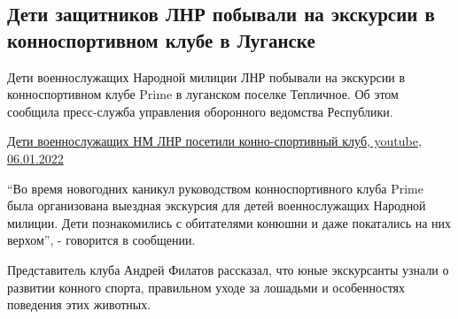  
 
 
 
 
\subsection{Дети защитников ЛНР побывали на экскурсии в конноспортивном клубе в Луганске}
\label{sec:06_01_2022.stz.news.lnr.lug_info.1.deti_konno_sportivnyj_klub}


Дети военнослужащих Народной милиции ЛНР побывали на экскурсии в
конноспортивном клубе Prime в луганском поселке Тепличное. Об этом сообщила
пресс-служба управления оборонного ведомства Республики.

\href{https://www.youtube.com/watch?v=azxdcZgdePA}{%
Дети военнослужащих НМ ЛНР посетили конно-спортивный клуб, youtube, 06.01.2022%
}


\enquote{Во время новогодних каникул руководством конноспортивного клуба Prime была
организована выездная экскурсия для детей военнослужащих Народной милиции. Дети
познакомились с обитателями конюшни и даже покатались на них верхом}, -
говорится в сообщении.


Представитель клуба Андрей Филатов рассказал, что юные экскурсанты узнали о
развитии конного спорта, правильном уходе за лошадьми и особенностях поведения
этих животных. 

